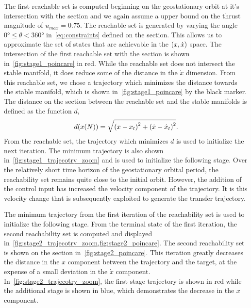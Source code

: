 The first reachable set is computed beginning on the geostationary orbit at it's intersection with the \Poincare section and we again assume a upper bound on the thrust magnitude of \( u_{max} = 0.75 \).
The reachable set is generated by varying the angle \( \ang{0} \leq \theta < \ang{360} \) in~\cref{eq:constraints} defined on the \Poincare section.
This allows us to approximate the set of states that are achievable in the \( \left( x ,\dot{x} \right) \) space.
The intersection of the first reachable set with the \Poincare section is shown in~\cref{fig:stage1_poincare} in red.
While the reachable set does not intersect the stable manifold, it does reduce some of the distance in the \(\dot{x}\) dimension.
From this reachable set, we chose a trajectory which minimizes the distance towards the stable manifold, which is shown in~\cref{fig:stage1_poincare} by the black marker.
The distance on the \Poincare section between the reachable set and the stable manifolds is defined as the function \( d \),
\begin{align*}
        d(x(N)) = \sqrt{\left( x - x_t \right)^2 + \left( \dot{x} - \dot{x}_t \right)^2}.
\end{align*}
From the reachable set, the trajectory which minimizes \( d \) is used to initialize the next iteration.
The minimum trajectory is also shown in~\cref{fig:stage1_trajecotry_zoom} and is used to initialize the following stage.
Over the relatively short time horizon of the geostationary orbital period, the reachability set remains quite close to the initial orbit. 
However, the addition of the control input has increased the velocity component of the trajectory.
It is this velocity change that is subsequently exploited to generate the transfer trajectory.

The minimum trajectory from the first iteration of the reachability set is used to initialize the following stage.
From the terminal state of the first iteration, the second reachability set is computed and displayed in~\cref{fig:stage2_trajecotry_zoom,fig:stage2_poincare}.
The second reachability set is shown on the \Poincare section in~\cref{fig:stage2_poincare}.
This iteration greatly decreases the distance in the \( x \) component between the trajectory and the target, at the expense of a small deviation in the \( \dot{x} \) component.
In~\cref{fig:stage2_trajecotry_zoom}, the first stage trajectory is shown in red while the additional stage is shown in blue, which demonstrates the decrease in the \( x \) component.

